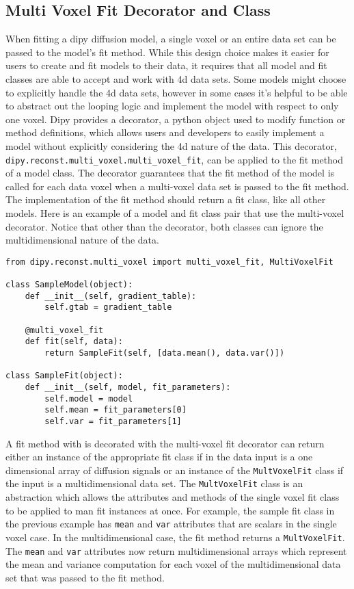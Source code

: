 \subsection{Multi Voxel Fit Decorator and Class}

When fitting a dipy diffusion model, a single voxel or an entire data set can be passed to the model's fit method. While this design choice makes it easier for users to create and fit models to their data, it requires that all model and fit classes are able to accept and work with 4d data sets. Some models might choose to explicitly handle the 4d data sets, however in some cases it's helpful to be able to abstract out the looping logic and implement the model with respect to only one voxel. Dipy provides a decorator, a python object used to modify function or method definitions, which allows users and developers to easily implement a model without explicitly considering the 4d nature of the data. This decorator, \verb|dipy.reconst.multi_voxel.multi_voxel_fit|, can be applied to the fit method of a model class. The decorator guarantees that the fit method of the model is called for each data voxel when a multi-voxel data set is passed to the fit method. The implementation of the fit method should return a fit class, like all other models. Here is an example of a model and fit class pair that use the multi-voxel decorator. Notice that other than the decorator, both classes can ignore the multidimensional nature of the data.

\begin{verbatim}
from dipy.reconst.multi_voxel import multi_voxel_fit, MultiVoxelFit

class SampleModel(object):
    def __init__(self, gradient_table):
        self.gtab = gradient_table

    @multi_voxel_fit
    def fit(self, data):
        return SampleFit(self, [data.mean(), data.var()])

class SampleFit(object):
    def __init__(self, model, fit_parameters):
        self.model = model
        self.mean = fit_parameters[0]
        self.var = fit_parameters[1]
\end{verbatim}

A fit method with is decorated with the multi-voxel fit decorator can return either an instance of the appropriate fit class if in the data input is a one dimensional array of diffusion signals or an instance of the \verb|MultVoxelFit| class if the input is a multidimensional data set. The \verb|MultVoxelFit| class is an abstraction which allows the attributes and methods of the single voxel fit class to be applied to man fit instances at once. For example, the sample fit class in the previous example has \verb|mean| and \verb|var| attributes that are scalars in the single voxel case. In the multidimensional case, the fit method returns a \verb|MultVoxelFit|. The \verb|mean| and \verb|var| attributes now return multidimensional arrays which represent the mean and variance computation for each voxel of the multidimensional data set that was passed to the fit method.

